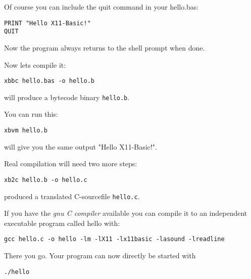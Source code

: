 Of course you can include the quit command in your hello.bas:
\begin{mdframed}[hidealllines=true,backgroundcolor=blue!20]
\begin{verbatim}
PRINT "Hello X11-Basic!"
QUIT
\end{verbatim}
\end{mdframed}
Now the program always returns to the shell prompt when done. 

Now lets compile it:
\begin{mdframed}[hidealllines=true,backgroundcolor=black!20]
\begin{verbatim}
xbbc hello.bas -o hello.b
\end{verbatim}
\end{mdframed}
will produce a bytecode binary \verb|hello.b|.

You can run this:
\begin{mdframed}[hidealllines=true,backgroundcolor=black!20]
\begin{verbatim}
xbvm hello.b 
\end{verbatim}
\end{mdframed}
will give you the same output "Hello X11-Basic!".

Real compilation will need two more steps:

\begin{mdframed}[hidealllines=true,backgroundcolor=black!20]
\begin{verbatim}
xb2c hello.b -o hello.c 
\end{verbatim}
\end{mdframed}

produced a translated C-sourcefile \verb|hello.c|.

If you have the {\it gnu C compiler} available you can compile it to an 
independent executable program called hello with:

\begin{mdframed}[hidealllines=true,backgroundcolor=black!20]
\begin{verbatim}
gcc hello.c -o hello -lm -lX11 -lx11basic -lasound -lreadline
\end{verbatim}
\end{mdframed}

There you go. Your program can now directly be started with 
\begin{mdframed}[hidealllines=true,backgroundcolor=black!20]
\begin{verbatim}
./hello
\end{verbatim}
\end{mdframed}

